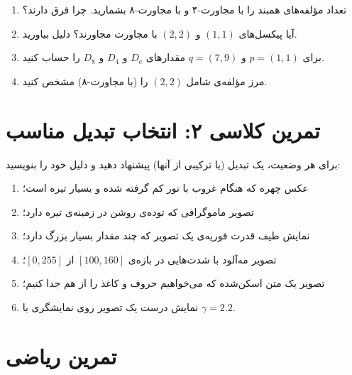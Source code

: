 \documentclass[11pt,a4paper]{article}
\begin{document}
	\begin{enumerate}
		\item تعداد مؤلفه‌های همبند را با مجاورت-۴ و با مجاورت-۸ بشمارید. چرا فرق دارند؟
		\item آیا پیکسل‌های $(1,1)$ و $(2,2)$ با مجاورت  مجاورند؟ دلیل بیاورید.
		\item برای $p=(1,1)$ و $q=(7,9)$ مقدارهای $D_e$ و $D_4$ و $D_8$ را حساب کنید.
		\item مرز مؤلفه‌ی شامل $(2,2)$ را (با مجاورت-۸) مشخص کنید.
	\end{enumerate}
	
	
	\section{تمرین کلاسی ۲: انتخاب تبدیل مناسب}
	
	برای هر وضعیت، یک تبدیل (یا ترکیبی از آنها) پیشنهاد دهید و دلیل خود را بنویسید:
	
	\begin{enumerate}
		\item عکس چهره که هنگام غروب با نور کم گرفته شده و بسیار تیره است؛
		\item تصویر ماموگرافی که توده‌ی روشن در زمینه‌ی تیره دارد؛
		\item نمایش طیف قدرت فوریه‌ی یک تصویر که چند مقدار بسیار بزرگ دارد؛
		\item تصویر مه‌آلود با شدت‌هایی در بازه‌ی $[100,160]$ از $[0,255]$؛
		\item تصویر یک متن اسکن‌شده که می‌خواهیم حروف و کاغذ را از هم جدا کنیم؛
		\item نمایش درست یک تصویر روی نمایشگری با $\gamma=2.2$.
	\end{enumerate}
	
	
	\section{تمرین ریاضی}
	
\end{document}
